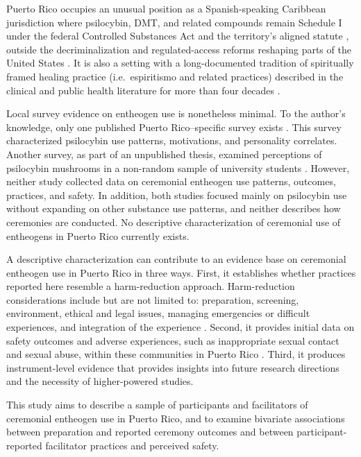 \documentclass[12pt]{article}
\begin{document}
Puerto Rico occupies an unusual position as a Spanish-speaking Caribbean jurisdiction where psilocybin,
DMT, and related compounds remain Schedule I under the federal Controlled Substances Act
\citep{uscongress1970csa} and the territory's aligned statute \citep{pr1971csa}, outside the
decriminalization and regulated-access reforms reshaping parts of the United States
\citep{siegel2023psychedelic}. It is also a setting with a long-documented tradition of spiritually framed
healing practice (i.e.\ espiritismo and related practices) described in the clinical and public health
literature for more than four decades
\citep{koss1980therapist,comasdiaz1981puertorican,bird1981sociopsychiatry,zerrate2022espiritismo}.

Local survey evidence on entheogen use is nonetheless minimal. To the author's knowledge, only one
published Puerto Rico--specific survey exists \citep{velezrodriguez2026psilocybin}. This survey
characterized psilocybin use patterns, motivations, and personality correlates. Another survey, as part of
an unpublished thesis, examined perceptions of psilocybin mushrooms in a non-random sample of university
students \citep{doeltermorales2020hongos}. However, neither study collected data on ceremonial entheogen
use patterns, outcomes, practices, and safety. In addition, both studies focused mainly on psilocybin use
without expanding on other substance use patterns, and neither describes how ceremonies are conducted. No
descriptive characterization of ceremonial use of entheogens in Puerto Rico currently exists.

A descriptive characterization can contribute to an evidence base on ceremonial entheogen use in Puerto
Rico in three ways. First, it establishes whether practices reported here resemble a harm-reduction
approach. Harm-reduction considerations include but are not limited to: preparation, screening,
environment, ethical and legal issues, managing emergencies or difficult experiences, and integration of
the experience \citep{gorman2021psychedelic,pilecki2021ethical,dutton2025harm}. Second, it provides initial
data on safety outcomes and adverse experiences, such as inappropriate sexual contact and sexual abuse,
within these communities in Puerto Rico \citep{kruger2025psychedelic,peluso2020reflections}. Third, it
produces instrument-level evidence that provides insights into future research directions and the necessity
of higher-powered studies.

This study aims to describe a sample of participants and facilitators of ceremonial entheogen use in Puerto
Rico, and to examine bivariate associations between preparation and reported ceremony outcomes and between
participant-reported facilitator practices and perceived safety.
\end{document}
